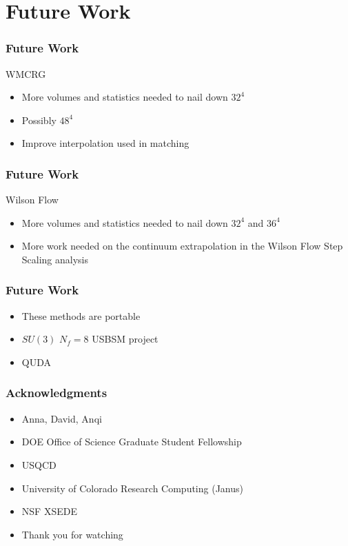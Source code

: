 \documentclass{beamer}
\begin{document}
  \section{Future Work}
  \addtocounter{framenumber}{-1}

  \begin{frame}
    \frametitle{Future Work}
    WMCRG
    \begin{itemize}
      \item More volumes and statistics needed to nail down $32^4$
      \item Possibly $48^4$
      \item Improve interpolation used in matching
    \end{itemize}
  \end{frame}

  \begin{frame}
    \frametitle{Future Work}
    Wilson Flow
    \begin{itemize}
      \item More volumes and statistics needed to nail down $32^4$ and $36^4$
      \item More work needed on the continuum extrapolation in the Wilson Flow Step Scaling analysis
    \end{itemize}
  \end{frame}

  \begin{frame}
    \frametitle{Future Work}
    \begin{itemize}
      \item These methods are portable
      \item $SU(3)$ $N_f=8$ USBSM project
      \item QUDA
    \end{itemize}
  \end{frame}

  \begin{frame}
    \frametitle{Acknowledgments}
    \begin{itemize}
      \item{Anna, David, Anqi}
      \item{DOE Office of Science Graduate Student Fellowship}
      \item{USQCD}
      \item{University of Colorado Research Computing (Janus)}
      \item{NSF XSEDE}
      \item{Thank you for watching}
    \end{itemize}
  \end{frame}
\end{document}
